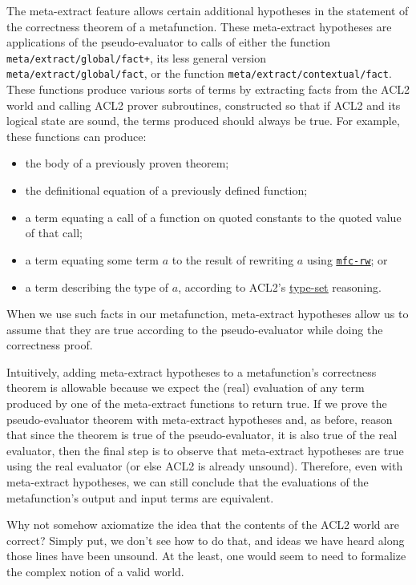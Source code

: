 The meta-extract feature allows certain additional hypotheses in the
statement of the correctness theorem of a metafunction.  These meta-extract
hypotheses are applications of the pseudo-evaluator to calls of either the
function \texttt{meta\-/extract\-/global\-/fact+}, its less general
version \texttt{meta\-/extract\-/global\-/fact}, or the function
\texttt{meta\-/extract\-/contextual\-/fact}.
These functions produce various
sorts of terms by extracting facts from the ACL2 world and calling
ACL2 prover subroutines, constructed so that if ACL2 and its logical
state are sound, the terms produced should always be true.  For
example, these functions can produce:
\begin{itemize}
\item the body of a previously proven theorem;
\item the definitional equation of a previously defined function;
\item a term equating a call of a function on quoted constants to the
  quoted value of that call;
\item a term equating some term $a$ to the result of rewriting $a$
  using \href{http://www.cs.utexas.edu/users/moore/acl2/manuals/current/manual/index.html?topic=ACL2\_\_\_\_MFC-RW}{\underline{\tt mfc-rw}}; or
\item a term describing the type of $a$, according to ACL2's
  \href{http://www.cs.utexas.edu/users/moore/acl2/manuals/current/manual/index.html?topic=ACL2\_\_\_\_TYPE-SET}{\underline{type-set}}
  reasoning.
\end{itemize}
When we use such facts in our metafunction, meta-extract hypotheses
allow us to assume that they are true according to the
pseudo-evaluator while doing the correctness proof.

Intuitively, adding meta-extract hypotheses to a metafunction's
correctness theorem is allowable because we expect the (real)
evaluation of any term produced by one of the meta-extract functions
to return true.  If we prove the pseudo-evaluator theorem with
meta-extract hypotheses and, as before, reason that since the theorem
is true of the pseudo-evaluator, it is also true of the real
evaluator, then the final step is to observe that meta-extract
hypotheses are true using the real evaluator (or else ACL2 is already
unsound).  Therefore, even with meta-extract hypotheses, we can still
conclude that the evaluations of the metafunction's output and input
terms are equivalent.

Why not somehow axiomatize the idea that the contents of the ACL2
world are correct?  Simply put, we don't see how to do that, and ideas
we have heard along those lines have been unsound.  At the least, one
would seem to need to formalize the complex notion of a valid world.

